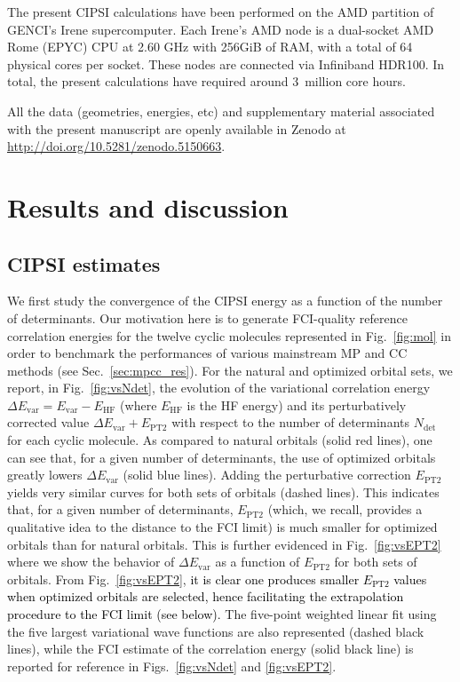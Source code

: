 \documentclass[aip,jcp,reprint,noshowkeys,superscriptaddress,floatfix]{revtex4-1}
\newcommand{\alert}[1]{\textcolor{black}{#1}}
\newcommand{\Ndet}{N_\text{det}}
\newcommand{\EHF}{E_\text{HF}}
\newcommand{\Evar}{E_\text{var}}
\newcommand{\EPT}{E_\text{PT2}}
\begin{document}
The present CIPSI calculations have been performed on the AMD partition of GENCI's Irene supercomputer. 
Each Irene's AMD node is a dual-socket AMD Rome (EPYC) CPU at 2.60 GHz with 256GiB of RAM, with a total of 64 physical cores per socket. 
These nodes are connected via Infiniband HDR100. 
In total, the present calculations have required around 3~million core hours.

All the data (geometries, energies, etc) and supplementary material associated with the present manuscript are openly available in Zenodo at \url{http://doi.org/10.5281/zenodo.5150663}.

\section{Results and discussion}
\label{sec:res}

\subsection{CIPSI estimates}
\label{sec:cipsi_res}

We first study the convergence of the CIPSI energy as a function of the number of determinants.
Our motivation here is to generate FCI-quality reference correlation energies for the twelve cyclic molecules represented in Fig.~\ref{fig:mol} in order to benchmark the performances of various mainstream MP and CC methods (see Sec.~\ref{sec:mpcc_res}).
For the natural and optimized orbital sets, we report, in Fig.~\ref{fig:vsNdet}, the evolution of the variational correlation energy $\Delta \Evar = \Evar - \EHF$ (where $\EHF$ is the HF energy) and its perturbatively corrected value $\Delta \Evar + \EPT$ with respect to the number of determinants $\Ndet$ for each cyclic molecule.
As compared to natural orbitals (solid red lines), one can see that, for a given number of determinants, the use of optimized orbitals greatly lowers $\Delta \Evar$ (solid blue lines).
Adding the perturbative correction $\EPT$ yields very similar curves for both sets of orbitals (dashed lines).
This indicates that, for a given number of determinants, $\EPT$ (which, we recall, provides a qualitative idea to the distance to the FCI limit) is much smaller for optimized orbitals than for natural orbitals.
This is further evidenced in Fig.~\ref{fig:vsEPT2} where we show the behavior of $\Delta \Evar$ as a function of $\EPT$ for both sets of orbitals.
From Fig.~\ref{fig:vsEPT2}, \alert{it is clear one produces smaller $\EPT$ values when optimized orbitals are selected, hence facilitating the extrapolation procedure to the FCI limit (see below).}
The five-point weighted linear fit using the five largest variational wave functions are also represented (dashed black lines), while the FCI estimate of the correlation energy (solid black line) is reported for reference in Figs.~\ref{fig:vsNdet} and \ref{fig:vsEPT2}.
\end{document}
